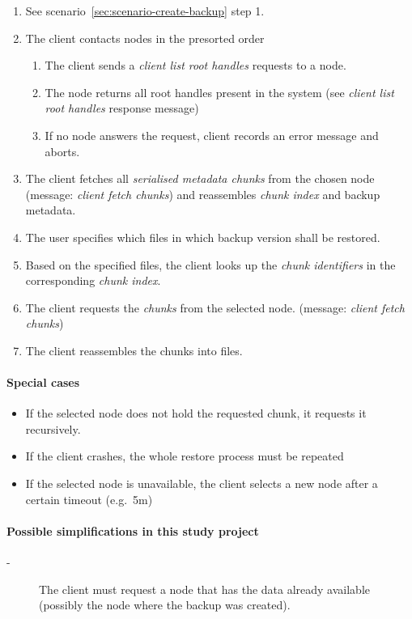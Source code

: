 \begin{enumerate}
    \item See scenario~\ref{sec:scenario-create-backup} step 1.
    \item The client contacts nodes in the presorted order
        \begin{enumerate}
            \item The client sends a \emph{client list root handles} requests to a node.
            \item The node returns all root handles present in the system (see \emph{client list root handles} response message)
            \item If no node answers the request, client records an error message and aborts.
        \end{enumerate}
    \item The client fetches all \emph{serialised metadata chunks} from the chosen node (message: \emph{client fetch chunks}) and reassembles \emph{chunk index} and backup metadata.
    \item The user specifies which files in which backup version shall be restored. %
    \item Based on the specified files, the client looks up the \emph{chunk identifiers} in the corresponding \emph{chunk index}.
    \item The client requests the \emph{chunks} from the selected node. (message: \emph{client fetch chunks})
    \item The client reassembles the chunks into files.
\end{enumerate}

\paragraph{Special cases}
\begin{itemize}
    \item If the selected node does not hold the requested chunk, it requests it recursively.
    \item If the client crashes, the whole restore process must be repeated
    \item If the selected node is unavailable, the client selects a new node after a certain timeout (e.g.\ 5m)
\end{itemize}

\paragraph{Possible simplifications in this study project}
\begin{description}
    \item[-] The client must request a node that has the data already available (possibly the node where the backup was created).
\end{description}


